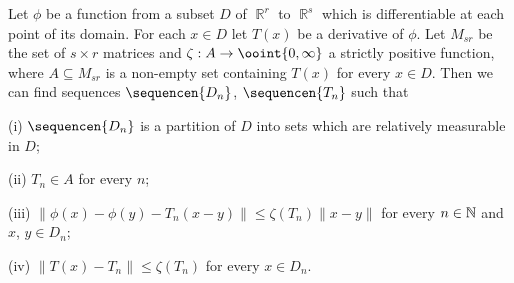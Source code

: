  Let $\phi$ be a
function from a subset $D$ of $\BbbR^r$ to $\BbbR^s$ which is
differentiable at
each point of its domain.   For each $x\in D$ let $T(x)$ be a derivative
of $\phi$.   Let $M_{sr}$ be the set of $s\times r$ matrices and
$\zeta:A\to\ooint{0,\infty}$ a strictly positive function, where
$A\subseteq M_{sr}$ is a non-empty set containing $T(x)$ for every
$x\in D$.   Then we
can find sequences $\sequencen{D_n}$, $\sequencen{T_n}$ such that

(i) $\sequencen{D_n}$ is a partition of $D$ into sets which are
relatively measurable in $D$;

(ii) $T_n\in A$ for every $n$;

(iii) $\|\phi(x)-\phi(y)-T_n(x-y)\|\le\zeta(T_n)\|x-y\|$ for every
$n\in\Bbb N$ and $x$, $y\in D_n$;

(iv) $\|T(x)-T_n\|\le\zeta(T_n)$ for every $x\in D_n$.

